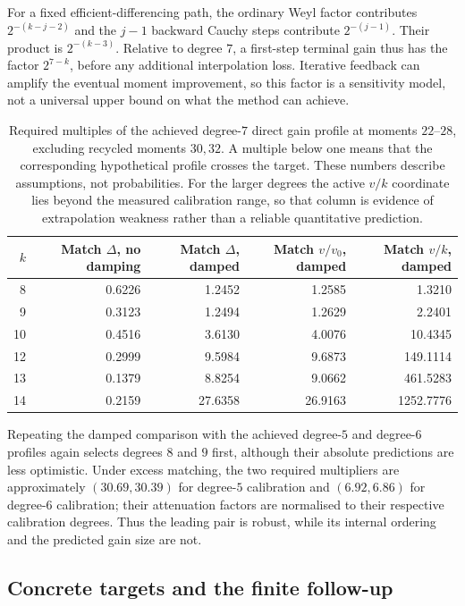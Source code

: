 \documentclass[11pt,letterpaper]{article}
\numberwithin{equation}{section}
\begin{document}
For a fixed efficient-differencing path, the ordinary Weyl factor contributes
$2^{-(k-j-2)}$ and the $j-1$ backward Cauchy steps contribute
$2^{-(j-1)}$. Their product is $2^{-(k-3)}$. Relative to degree $7$, a
first-step terminal gain thus has the factor $2^{7-k}$, before any
additional interpolation loss. Iterative feedback can amplify the eventual
moment improvement, so this factor is a sensitivity model, not a universal
upper bound on what the method can achieve.

\begin{table}[htbp]
\centering\small
\begin{tabular}{rrrrr}
\hline
$k$ & Match $\Delta$, no damping & Match $\Delta$, damped
 & Match $v/v_0$, damped & Match $v/k$, damped\\
\hline
8  &0.6226&1.2452&1.2585&1.3210\\
9  &0.3123&1.2494&1.2629&2.2401\\
10 &0.4516&3.6130&4.0076&10.4345\\
12 &0.2999&9.5984&9.6873&149.1114\\
13 &0.1379&8.8254&9.0662&461.5283\\
14 &0.2159&27.6358&26.9163&1252.7776\\
\hline
\end{tabular}
\caption{Required multiples of the achieved degree-$7$ direct gain profile
at moments $22$--$28$, excluding recycled moments $30,32$. A multiple below
one means that the corresponding hypothetical profile crosses the target.
These numbers describe assumptions, not probabilities. For the larger
degrees the active $v/k$ coordinate lies beyond the measured calibration
range, so that column is evidence of extrapolation weakness rather than a
reliable quantitative prediction.}
\label{tab:transfer-sensitivity}
\end{table}

Repeating the damped comparison with the achieved degree-$5$ and degree-$6$
profiles again selects degrees $8$ and $9$ first, although their absolute
predictions are less optimistic. Under excess matching, the two required
multipliers are approximately $(30.69,30.39)$ for degree-$5$ calibration
and $(6.92,6.86)$ for degree-$6$ calibration; their attenuation factors are
normalised to their respective calibration degrees. Thus the leading pair
is robust, while its internal ordering and the predicted gain size are not.

\subsection{Concrete targets and the finite follow-up}
\end{document}
